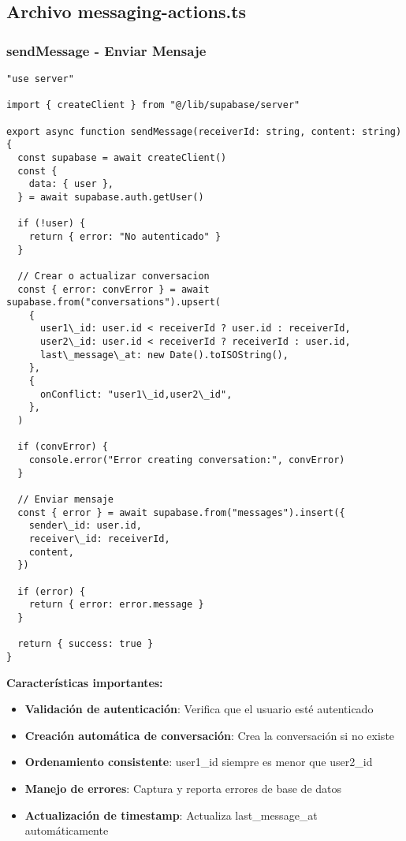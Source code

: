 \documentclass[12pt,a4paper]{article}
\begin{document}
\subsection{Archivo messaging-actions.ts}

\subsubsection{sendMessage - Enviar Mensaje}

\begin{lstlisting}[caption=Función sendMessage completa]
"use server"

import { createClient } from "@/lib/supabase/server"

export async function sendMessage(receiverId: string, content: string) {
  const supabase = await createClient()
  const {
    data: { user },
  } = await supabase.auth.getUser()

  if (!user) {
    return { error: "No autenticado" }
  }

  // Crear o actualizar conversacion
  const { error: convError } = await supabase.from("conversations").upsert(
    {
      user1\_id: user.id < receiverId ? user.id : receiverId,
      user2\_id: user.id < receiverId ? receiverId : user.id,
      last\_message\_at: new Date().toISOString(),
    },
    {
      onConflict: "user1\_id,user2\_id",
    },
  )

  if (convError) {
    console.error("Error creating conversation:", convError)
  }

  // Enviar mensaje
  const { error } = await supabase.from("messages").insert({
    sender\_id: user.id,
    receiver\_id: receiverId,
    content,
  })

  if (error) {
    return { error: error.message }
  }

  return { success: true }
}
\end{lstlisting}

\textbf{Características importantes:}
\begin{itemize}
    \item \textbf{Validación de autenticación}: Verifica que el usuario esté autenticado
    \item \textbf{Creación automática de conversación}: Crea la conversación si no existe
    \item \textbf{Ordenamiento consistente}: user1\_id siempre es menor que user2\_id
    \item \textbf{Manejo de errores}: Captura y reporta errores de base de datos
    \item \textbf{Actualización de timestamp}: Actualiza last\_message\_at automáticamente
\end{itemize}
\end{document}
